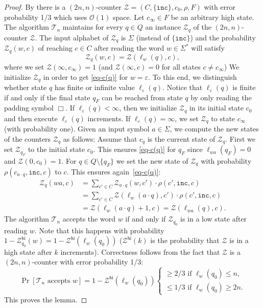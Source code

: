 \documentclass{theoretics}
\renewcommand{\O}{\mathcal{O}}
\newcommand{\BZ}{\mathcal{Z}}
\newcommand{\eps}{\varepsilon}
\renewcommand{\geq}{\geqslant}
\renewcommand{\leq}{\leqslant}
\renewcommand{\ge}{\geq}
\renewcommand{\le}{\leq}
\begin{document}
\begin{proof}
By  there is a 
$(2n,n)$-counter $\BZ = (C,\{\mathtt{inc}\},c_0,\rho,F)$ with error probability 1/3 which uses $\O(1)$ space.
Let  $c_{\infty} \in F$ be an arbitrary high state.
The algorithm $\mathcal{T}_n$ maintains for every $q \in Q$ an instance $\BZ_q$ of the $(2n,n)$-counter $\BZ$.
The input alphabet of $\BZ_q$ is $\Sigma$ (instead of $\{\mathtt{inc}\}$) and
the probability $\BZ_q(w,c)$ of reaching $c \in C$ after reading the word $w \in \Sigma^*$ will satisfy
\begin{equation} \label{eq-c(q)}
\BZ_q(w,c) = \BZ(\ell_w(q),c),
\end{equation}
where we set $\BZ(\infty,c_\infty) = 1$ (and $\BZ(\infty,c)=0$ for all states $c \neq c_\infty$)
We initialize $\BZ_q$ in order to get \eqref{eq-c(q)} for $w = \eps$.
To this end, we distinguish whether state $q$ has finite or infinite value $\ell_\eps(q)$.
Notice that $\ell_\eps(q)$ is finite if and only if the final state $q_F$ can be reached from state $q$
by only reading the padding symbol $\Box$.
If $\ell_\eps(q) < \infty$, then we initialize $\BZ_q$ in its initial state $c_0$ and then execute
$\ell_\eps(q)$ increments.
If $\ell_\eps(q) = \infty$, we set $\BZ_q$ to state $c_\infty$ (with probability one).
Given an input symbol $a \in \Sigma$, we compute the new states of the counters
$\BZ_q$ as follows: Assume that $c_q$ is the current state of $\BZ_q$.
First we set $\BZ_{q_F}$ to the initial state $c_0$.
This ensures \eqref{eq-c(q)} for $q_F$ since $\ell_{wa}(q_F) = 0$ and $\BZ(0,c_0) = 1$.
For $q \in Q \setminus \{q_F\}$ we set the new state of $\BZ_q$ with probability $\rho(c_{a \cdot q}, \mathtt{inc}, c)$
to $c$. This ensures again~\eqref{eq-c(q)}:
\begin{align*}
	\BZ_q(wa,c) &= \sum_{c' \in C} \BZ_{a \cdot q}(w,c') \cdot \rho(c',\mathtt{inc},c) \\
	&= \sum_{c' \in C} \BZ(\ell_w(a \cdot q),c') \cdot \rho(c',\mathtt{inc},c) \\
	& = \BZ(\ell_w(a \cdot q)+1,c) = \BZ(\ell_{wa}(q),c).
\end{align*}
The algorithm $\mathcal{T}_n$ accepts the word $w$ if and only if $\BZ_{q_0}$ is in a low state after reading $w$.
Note that this happens with probability $1-\BZ_{q_0}^{\mathsf{hi}}(w) = 1- \BZ^{\mathsf{hi}}(\ell_w(q_0))$ ($\BZ^{\mathsf{hi}}(k)$ is the probability
that $\BZ$ is in a high state after $k$ increments). 
Correctness follows from the fact that $\BZ$ is a $(2n,n)$-counter with error probability 1/3: 
\[ 
\Pr[\mathcal{T}_n \text{ accepts } w] = 1-\BZ^{\mathsf{hi}}(\ell_w(q_0)) 
\begin{cases}
\ge 2/3 \text{ if } \ell_w(q_0) \le n, \\
\le 1/3 \text{ if }  \ell_w(q_0) \ge 2n.
\end{cases}
\]
This proves the lemma.
\end{proof}
\end{document}
